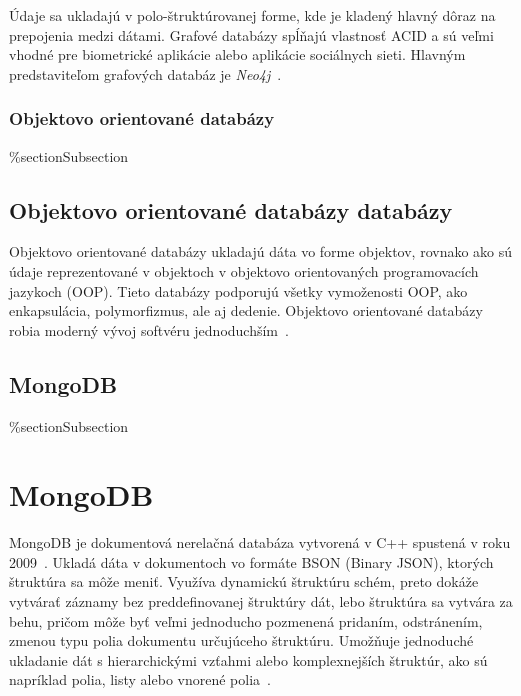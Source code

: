 Údaje sa ukladajú v polo-štruktúrovanej forme, kde je kladený hlavný dôraz na prepojenia medzi dátami. Grafové databázy spĺňajú vlastnosť ACID a sú veľmi vhodné pre biometrické aplikácie alebo aplikácie sociálnych sieti. Hlavným predstaviteľom grafových databáz je \textit{Neo4j}~\cite{NoSQLDBvsRealtionDB}.

%
%
{
	\subsubsection{Objektovo orientované databázy}
}
{
	\%section{Subsection}
	\subsection{Objektovo orientované databázy databázy}
}
\label{subsubsection:object_oriented_db}
Objektovo orientované databázy ukladajú dáta vo forme objektov, rovnako ako sú údaje reprezentované v objektoch v objektovo orientovaných programovacích jazykoch (OOP). Tieto databázy podporujú všetky vymoženosti OOP, ako enkapsulácia, polymorfizmus, ale aj dedenie. Objektovo orientované databázy robia moderný vývoj softvéru jednoduchším~\cite{NoSQLDBvsRealtionDB}.

%
%
{
	\subsection{MongoDB}
}
{
	\%section{Subsection}
	\section{MongoDB}
}
\label{subsection:mongodb}
MongoDB je dokumentová nerelačná databáza vytvorená v C++ spustená v roku 2009~\cite{NoSQLDBvsRealtionDB}. Ukladá dáta v dokumentoch vo formáte BSON (Binary JSON), ktorých štruktúra sa môže meniť. Využíva dynamickú štruktúru schém, preto dokáže vytvárať záznamy bez preddefinovanej štruktúry dát, lebo štruktúra sa vytvára za behu, pričom môže byť veľmi jednoducho pozmenená pridaním, odstránením, zmenou typu polia dokumentu určujúceho štruktúru. Umožňuje jednoduché ukladanie dát s hierarchickými vzťahmi alebo komplexnejších štruktúr, ako sú napríklad polia, listy alebo vnorené polia~\cite{MongoDBvsMySQLCompared}.

